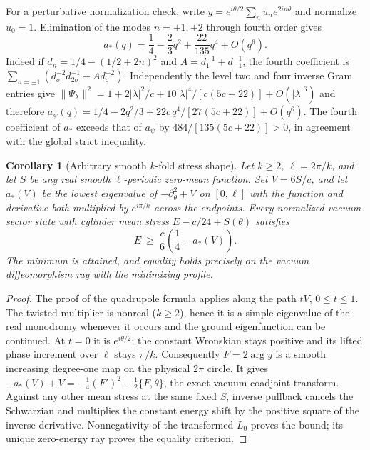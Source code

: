 \documentclass[11pt]{article}
\newtheorem{corollary}{Corollary}
\begin{document}
For a perturbative normalization check, write \(y=e^{i\theta/2}\sum_n u_ne^{2in\theta}\) and normalize \(u_0=1\). Elimination of the modes \(n=\pm1,\pm2\) through fourth order gives
\[
 a_*(q)=\frac14-\frac23q^2+\frac{22}{135}q^4+O(q^6).
\]
Indeed if \(d_n=1/4-(1/2+2n)^2\) and \(A=d_{1}^{-1}+d_{-1}^{-1}\), the fourth coefficient is
\(\sum_{\sigma=\pm1} (d_\sigma^{-2}d_{2\sigma}^{-1}-A d_\sigma^{-2})\).
Independently the level two and four inverse Gram entries give
\(\|\Psi_\lambda\|^2=1+2|\lambda|^2/c+10|\lambda|^4/[c(5c+22)]+O(|\lambda|^6)\)
and therefore
\(a_\psi(q)=1/4-2q^2/3+22c\,q^4/[27(5c+22)]+O(q^6)\).
The fourth coefficient of \(a_*\) exceeds that of \(a_\psi\) by \(484/[135(5c+22)]>0\), in agreement with the global strict inequality.


\begin{corollary}[Arbitrary smooth \(k\)-fold stress shape]
Let \(k\ge2\), \(\ell=2\pi/k\), and let \(S\) be any real smooth \(\ell\)-periodic zero-mean function. Set \(V=6S/c\), and let \(a_*(V)\) be the lowest eigenvalue of \(-\partial_\theta^2+V\) on \([0,\ell]\) with the function and derivative both multiplied by \(e^{i\pi/k}\) across the endpoints. Every normalized vacuum-sector state with cylinder mean stress \(E-c/24+S(\theta)\) satisfies
\[
 E\ \ge\ \frac c6\left(\frac14-a_*(V)\right).
\]
The minimum is attained, and equality holds precisely on the vacuum diffeomorphism ray with the minimizing profile.
\end{corollary}
\begin{proof}
The proof of the quadrupole formula applies along the path \(tV\), \(0\le t\le1\). The twisted multiplier is nonreal (\(k\ge2\)), hence it is a simple eigenvalue of the real monodromy whenever it occurs and the ground eigenfunction can be continued. At \(t=0\) it is \(e^{i\theta/2}\); the constant Wronskian stays positive and its lifted phase increment over \(\ell\) stays \(\pi/k\). Consequently \(F=2\arg y\) is a smooth increasing degree-one map on the physical \(2\pi\) circle. It gives \(-a_*(V)+V=-\tfrac14(F')^2-\tfrac12\{F,\theta\}\), the exact vacuum coadjoint transform. Against any other mean stress at the same fixed \(S\), inverse pullback cancels the Schwarzian and multiplies the constant energy shift by the positive square of the inverse derivative. Nonnegativity of the transformed \(L_0\) proves the bound; its unique zero-energy ray proves the equality criterion.
\end{proof}
\end{document}
